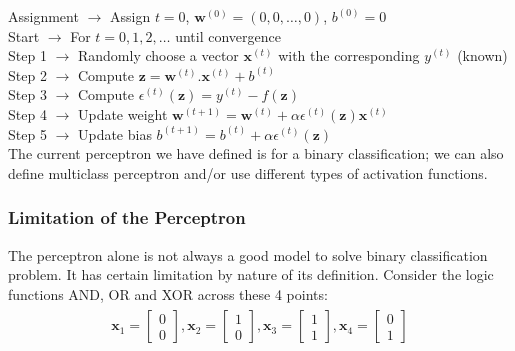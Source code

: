 \vspace{5mm}
\noindent Assignment $\rightarrow$ Assign $t=0$, $\textbf{w}^{(0)} = (0,0,\dots,0)$, $b^{(0)}=0$\\
Start $\rightarrow$ For $t=0,1,2,\dots$ until convergence\\
\indent Step 1 $\rightarrow$ Randomly choose a vector $\textbf{x}^{(t)}$ with the corresponding $y^{(t)}$ (known)\\
\indent Step 2 $\rightarrow$ Compute $\textbf{z}=\textbf{w}^{(t)}.\textbf{x}^{(t)} + b^{(t)}$\\
\indent Step 3 $\rightarrow$ Compute $\epsilon^{(t)}(\textbf{z}) = y^{(t)} - f(\textbf{z}) $\\
\indent Step 4 $\rightarrow$ Update weight $\textbf{w}^{(t+1)} = \textbf{w}^{(t)} + \alpha\epsilon^{(t)}(\textbf{z})\textbf{x}^{(t)}$ \\
\indent Step 5 $\rightarrow$ Update bias  $b^{(t+1)} = b^{(t)} + \alpha\epsilon^{(t)}(\textbf{z})$
\vspace{10mm}
\\
The current perceptron we have defined is for a binary classification; we can also define multiclass perceptron and/or use different types of activation functions.
\subsubsection{Limitation of the Perceptron}
The perceptron alone is not always a good model to solve binary classification problem. It has certain limitation by nature of its definition. Consider the logic functions AND, OR and XOR across these 4 points:
\begin{align}
  \begin{matrix}
    \textbf{x}_1 = \begin{bmatrix}
      0 \\
      0
    \end{bmatrix},
    \textbf{x}_2 = \begin{bmatrix}
      1 \\
      0
    \end{bmatrix},
    \textbf{x}_3 = \begin{bmatrix}
      1 \\
      1
    \end{bmatrix},
    \textbf{x}_4 = \begin{bmatrix}
      0 \\
      1
    \end{bmatrix}  
  \end{matrix}
\end{align}
